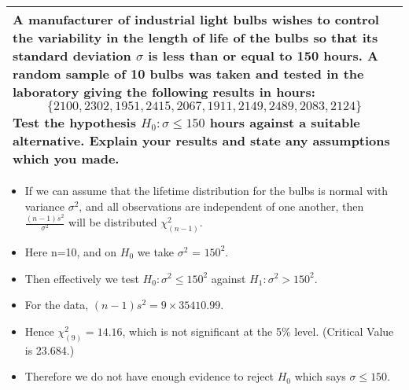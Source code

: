 \documentclass[a4paper,12pt]{article}
\begin{document}
\begin{table}[ht!]
 
\centering
 
\begin{tabular}{|p{15cm}|}
 
\hline   \large

\noindent A manufacturer of industrial light bulbs wishes to control the variability in the length of life of the bulbs so that its standard deviation $\sigma$ is less than or equal to 150 hours.  A random sample of 10 bulbs was taken and tested in the laboratory giving the following results in hours:
\[\{2100,  2302,  1951,  2415,  2067,  1911,  2149,  2489,  2083,  2124\}\]
Test the hypothesis $H_0: \sigma \leq 150$ hours against a suitable alternative.  Explain your results and state any assumptions which you made.

\\ \hline
  
\end{tabular}

\end{table}
\large 
\begin{itemize}
\item If we can assume that the lifetime distribution for the bulbs is normal with variance $\sigma^2$,
and all observations are independent of one another, then ${\displaystyle \frac{(n - 1)s^2}{\sigma^2} }$ will be distributed $\chi^2_{(n-1)}$.
\item Here n=10, and on $H_0$  we take $\sigma^2$ = $150^2$. 
\item Then effectively we test $H_0 : \sigma^2 \leq 150^2$ against
$H_1 : \sigma^2 > 150^2$.
\item For the data, $(n - 1)s^2 = 9 \times 35410.99$. 
\item Hence $\chi^2_{(9)} = 14.16$, which is not significant at the 5\%
level. (Critical Value is 23.684.)
\item Therefore we do not have enough evidence to reject $H_0$ which says $\sigma \leq 150$.
\end{itemize}
\end{document}
